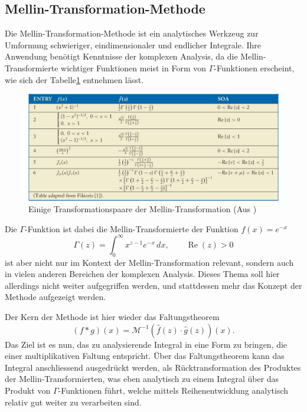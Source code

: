 \subsection{Mellin-Transformation-Methode
\label{mellin:subsection:mtmethod}}
Die Mellin-Transformation-Methode ist ein analytisches Werkzeug 
zur Umformung schwieriger, eindimensionaler und endlicher Integrale.
Ihre Anwendung benötigt Kenntnisse der komplexen Analysis, da 
die Mellin-Transformierte wichtiger Funktionen meist in Form von 
$\Gamma$-Funktionen erscheint, wie sich der Tabelle\ref{fig:mellin:tabelle} 
entnehmen lässt.
\begin{figure}
    \includegraphics[width=\textwidth]{papers/mellin/images/mellin_tabelle.png}
    \caption{Einige Transformationspaare der Mellin-Transformation 
    (Aus \cite{mellin:mellin-transform-method})}
    \label{fig:mellin:tabelle}
\end{figure}
Die $\Gamma$-Funktion ist dabei die Mellin-Transformierte der Funktion $f(x)=e^{-x}$
\begin{equation}
    \Gamma(z) = 
    \int_{0}^{\infty} x^{z-1}e^{-x} \,dx,
    \qquad \operatorname{Re}(z) > 0
\end{equation}
ist aber nicht nur im Kontext der Mellin-Transformation relevant, 
sondern auch in vielen anderen Bereichen der komplexen Analysis.
Dieses Thema soll hier allerdings nicht weiter aufgegriffen werden, 
und stattdessen mehr das Konzept der Methode aufgezeigt werden.

Der Kern der Methode ist hier wieder das Faltungstheorem
\[
    (f \ast g)(x) = \mathcal{M}^{-1}(\hat{f}(z) \cdot \hat{g}(z))(x)
    .
\]
Das Ziel ist es nun, das zu analysierende Integral in 
eine Form zu bringen, die einer multiplikativen Faltung entspricht.
Über das Faltungstheorem kann das Integral anschliessend ausgedrückt 
werden, als Rücktransformation des Produktes der Mellin-Transformierten, 
was eben analytisch zu einem Integral über das Produkt von  
$\Gamma$-Funktionen führt, welche mittels Reihenentwicklung analytisch 
relativ gut weiter zu verarbeiten sind.

